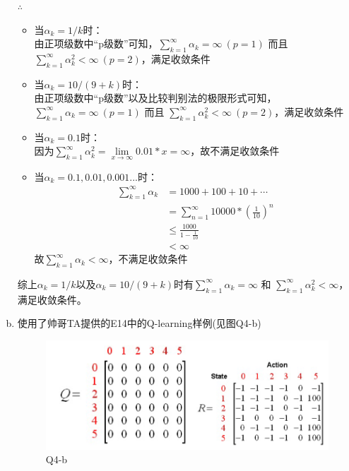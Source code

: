 \documentclass[a4paper, 11pt]{article}
\begin{document}
\begin{enumerate}[(a)]
$\therefore$
\begin{itemize}
  \item 当$\alpha_k = 1/k$时：\\
  由正项级数中“p级数”可知，$\sum\limits _{k=1}^\infty \alpha_k = \infty \ (p=1)$ 而且 $\sum\limits_{k=1}^\infty \alpha_k^2 < \infty \ (p=2)$，满足收敛条件
  \item 当$\alpha_k = 10/(9+k)$时：\\
  由正项级数中“p级数”以及比较判别法的极限形式可知，$\sum\limits _{k=1}^\infty \alpha_k = \infty \ (p=1)$ 而且 $\sum\limits_{k=1}^\infty \alpha_k^2 < \infty \ (p=2)$，满足收敛条件
  \item 当$\alpha_k = 0.1$时：\\
  因为$\sum\limits_{k=1}^\infty \alpha_k^2 = \lim\limits_{x \rightarrow \infty} 0.01*x = \infty $，故不满足收敛条件
  \item 当$\alpha_k = 0.1,0.01,0.001...$时：\\
  \begin{align*}
    \sum\limits _{k=1}^\infty \alpha_k &= 1000 + 100 + 10 + \cdots \\
    &= \sum\limits _{n=1}^\infty 10000*(\frac{1}{10})^n \\
    &\leq \frac{1000}{1-\frac{1}{10}} \\
    &< \infty
  \end{align*}
  故$\sum\limits _{k=1}^\infty \alpha_k < \infty$，不满足收敛条件
\end{itemize}
综上$\alpha_k = 1/k$以及$\alpha_k = 10/(9+k)$时有$\sum\limits _{k=1}^\infty \alpha_k = \infty$ 和 $\sum\limits_{k=1}^\infty \alpha_k^2 < \infty$，满足收敛条件。

\item
使用了帅哥TA提供的E14中的Q-learning样例(见图Q4-b)\\
\begin{figure}[h]
	\centering
	\includegraphics[scale = 0.28]{Q4-B.png}
  \caption{Q4-b}
\end{figure}


\end{enumerate}
\end{document}
